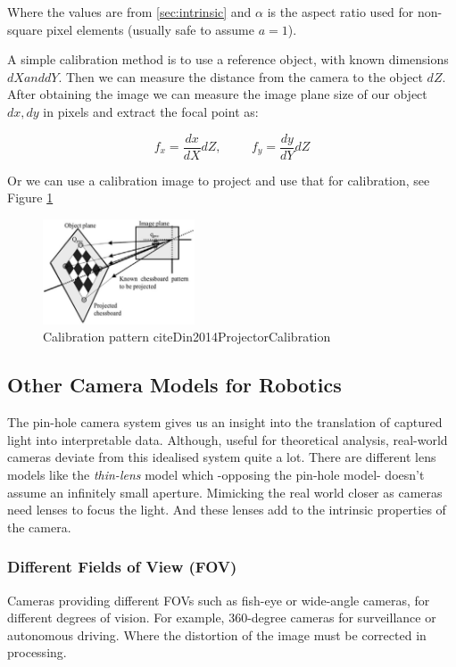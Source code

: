 Where the values are from \ref{sec:intrinsic} and $\alpha$ is the aspect ratio used for non-square pixel elements (usually safe to assume $a=1$).

A simple calibration method is to use a reference object, with known dimensions $dX and dY$. Then we can measure the distance from the camera to the object $dZ$. After obtaining the image we can measure the image plane size of our object $dx, dy$ in pixels and extract the focal point as:

\[ 
  f_x = \frac{dx}{dX} dZ , \hspace{1cm} f_y = \frac{dy}{dY}dZ
  \]
  
Or we can use a calibration image to project and use that for calibration, see Figure \ref{fig:calin-dots}

  \begin{figure}[h]
    \centering
    \includegraphics[width=0.4\textwidth]{assets/background/checkered.jpeg}
    \caption{Calibration pattern cite{Din2014ProjectorCalibration}}\label{fig:calin-dots}
  \end{figure}

\subsection{Other Camera Models for Robotics}
The pin-hole camera system gives us an insight into the translation of captured light into interpretable data. Although, useful for theoretical analysis, real-world cameras deviate from this idealised system quite a lot.
There are different lens models like the \emph{thin-lens} model which -opposing the pin-hole model- doesn't assume an infinitely small aperture. Mimicking the real world closer as cameras need lenses to focus the light. And these lenses add to the intrinsic properties of the camera.

\subsubsection{Different Fields of View (FOV)}
Cameras providing different FOVs such as fish-eye or wide-angle cameras, for different degrees of vision. For example, 360-degree cameras for surveillance or autonomous driving. Where the distortion of the image must be corrected in processing.

